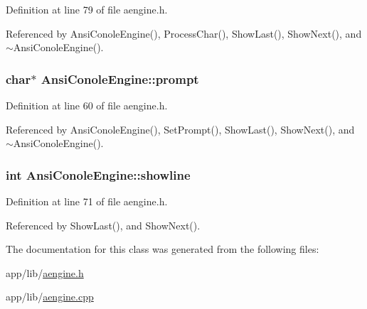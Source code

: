 Definition at line 79 of file aengine.\+h.



Referenced by Ansi\+Conole\+Engine(), Process\+Char(), Show\+Last(), Show\+Next(), and $\sim$\+Ansi\+Conole\+Engine().

\subsubsection[{\texorpdfstring{prompt}{prompt}}]{\setlength{\rightskip}{0pt plus 5cm}char$\ast$ Ansi\+Conole\+Engine\+::prompt\hspace{0.3cm}{\ttfamily [private]}}\hypertarget{classAnsiConoleEngine_a97ebef63ba0490711ed78733b6a87be5}{}\label{classAnsiConoleEngine_a97ebef63ba0490711ed78733b6a87be5}


Definition at line 60 of file aengine.\+h.



Referenced by Ansi\+Conole\+Engine(), Set\+Prompt(), Show\+Last(), Show\+Next(), and $\sim$\+Ansi\+Conole\+Engine().

\subsubsection[{\texorpdfstring{showline}{showline}}]{\setlength{\rightskip}{0pt plus 5cm}int Ansi\+Conole\+Engine\+::showline\hspace{0.3cm}{\ttfamily [private]}}\hypertarget{classAnsiConoleEngine_a24fe8cd3b3321c6dd4b26731cb1a8108}{}\label{classAnsiConoleEngine_a24fe8cd3b3321c6dd4b26731cb1a8108}


Definition at line 71 of file aengine.\+h.



Referenced by Show\+Last(), and Show\+Next().



The documentation for this class was generated from the following files\+:\begin{DoxyCompactItemize}
\item 
app/lib/\hyperlink{aengine_8h}{aengine.\+h}\item 
app/lib/\hyperlink{aengine_8cpp}{aengine.\+cpp}\end{DoxyCompactItemize}
